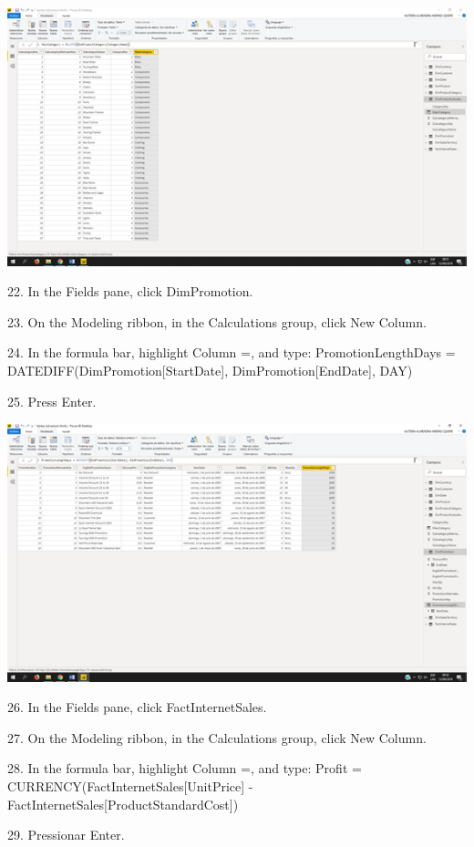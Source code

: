 \begin{center}
\includegraphics[width=15cm]{./Imagenes/img29} 
\end{center}

\item 22. In the Fields pane, click DimPromotion.
\item 23. On the Modeling ribbon, in the Calculations group, click New Column.
\item 24. In the formula bar, highlight Column =, and type:
PromotionLengthDays = DATEDIFF(DimPromotion[StartDate], DimPromotion[EndDate], DAY)
\item 25. Press Enter.

\begin{center}
\includegraphics[width=15cm]{./Imagenes/img30} 
\end{center}

\item 26. In the Fields pane, click FactInternetSales.
\item 27. On the Modeling ribbon, in the Calculations group, click New Column.
\item 28. In the formula bar, highlight Column =, and type:
Profit = CURRENCY(FactInternetSales[UnitPrice] -
FactInternetSales[ProductStandardCost])
\item 29. Pressionar Enter.


